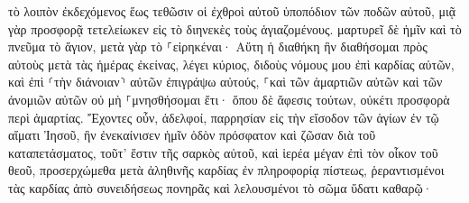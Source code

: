 \documentclass{openreader}
\begin{document}
τὸ λοιπὸν ἐκδεχόμενος ἕως τεθῶσιν οἱ ἐχθροὶ αὐτοῦ ὑποπόδιον τῶν ποδῶν αὐτοῦ, 
μιᾷ γὰρ προσφορᾷ τετελείωκεν εἰς τὸ διηνεκὲς τοὺς ἁγιαζομένους. 
μαρτυρεῖ δὲ ἡμῖν καὶ τὸ πνεῦμα τὸ ἅγιον, μετὰ γὰρ τὸ ⸀εἰρηκέναι· 
Αὕτη ἡ διαθήκη ἣν διαθήσομαι πρὸς αὐτοὺς μετὰ τὰς ἡμέρας ἐκείνας, λέγει κύριος, διδοὺς νόμους μου ἐπὶ καρδίας αὐτῶν, καὶ ἐπὶ ⸂τὴν διάνοιαν⸃ αὐτῶν ἐπιγράψω αὐτούς, 
⸀καὶ τῶν ἁμαρτιῶν αὐτῶν καὶ τῶν ἀνομιῶν αὐτῶν οὐ μὴ ⸀μνησθήσομαι ἔτι· 
ὅπου δὲ ἄφεσις τούτων, οὐκέτι προσφορὰ περὶ ἁμαρτίας. 
Ἔχοντες οὖν, ἀδελφοί, παρρησίαν εἰς τὴν εἴσοδον τῶν ἁγίων ἐν τῷ αἵματι Ἰησοῦ, 
ἣν ἐνεκαίνισεν ἡμῖν ὁδὸν πρόσφατον καὶ ζῶσαν διὰ τοῦ καταπετάσματος, τοῦτ’ ἔστιν τῆς σαρκὸς αὐτοῦ, 
καὶ ἱερέα μέγαν ἐπὶ τὸν οἶκον τοῦ θεοῦ, 
προσερχώμεθα μετὰ ἀληθινῆς καρδίας ἐν πληροφορίᾳ πίστεως, ῥεραντισμένοι τὰς καρδίας ἀπὸ συνειδήσεως πονηρᾶς καὶ λελουσμένοι τὸ σῶμα ὕδατι καθαρῷ· 
\end{document}

